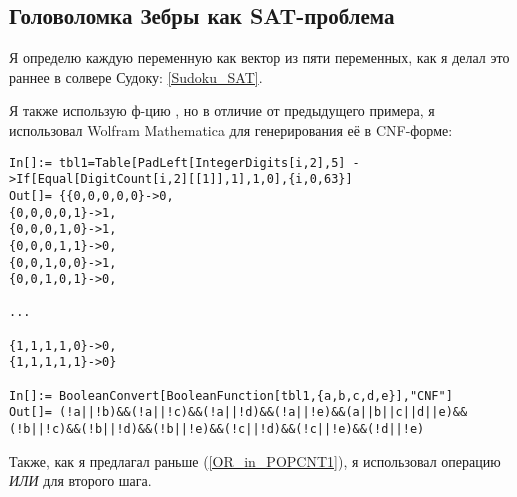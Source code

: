 \subsection{Головоломка Зебры как SAT-проблема}
\label{Zebra_SAT}

Я определю каждую переменную как вектор из пяти переменных, как я делал это раннее в солвере Судоку: \ref{Sudoku_SAT}.

Я также использую ф-цию , но в отличие от предыдущего примера,
я использовал Wolfram Mathematica для генерирования её в CNF-форме:

\begin{lstlisting}
In[]:= tbl1=Table[PadLeft[IntegerDigits[i,2],5] ->If[Equal[DigitCount[i,2][[1]],1],1,0],{i,0,63}]
Out[]= {{0,0,0,0,0}->0,
{0,0,0,0,1}->1,
{0,0,0,1,0}->1,
{0,0,0,1,1}->0,
{0,0,1,0,0}->1,
{0,0,1,0,1}->0,

...

{1,1,1,1,0}->0,
{1,1,1,1,1}->0}

In[]:= BooleanConvert[BooleanFunction[tbl1,{a,b,c,d,e}],"CNF"]
Out[]= (!a||!b)&&(!a||!c)&&(!a||!d)&&(!a||!e)&&(a||b||c||d||e)&&(!b||!c)&&(!b||!d)&&(!b||!e)&&(!c||!d)&&(!c||!e)&&(!d||!e)
\end{lstlisting}

Также, как я предлагал раньше (\ref{OR_in_POPCNT1}), я использовал операцию \textit{ИЛИ} для второго шага.


